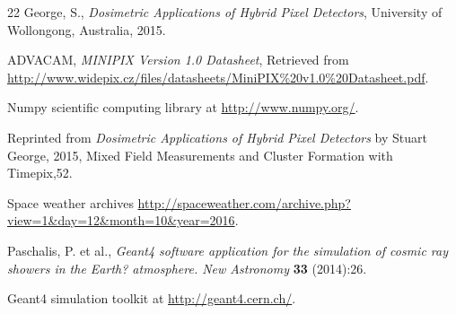 \begin{thebibliography}{9}
 22
  George, S., \textit{Dosimetric Applications of Hybrid Pixel Detectors}, University of Wollongong, Australia, 2015.

  ADVACAM, \textit{MINIPIX Version 1.0 Datasheet}, Retrieved from \url{http://www.widepix.cz/files/datasheets/MiniPIX\%20v1.0\%20Datasheet.pdf}.

  Numpy scientific computing library at \url{http://www.numpy.org/}.

  Reprinted from \textit{Dosimetric Applications of Hybrid Pixel Detectors} by Stuart George, 2015, Mixed Field Measurements and Cluster Formation with Timepix,52.

  Space weather archives \url{http://spaceweather.com/archive.php?view=1&day=12&month=10&year=2016}.

  Paschalis, P. et al., \textit{Geant4 software application for the simulation of cosmic ray showers in the Earth? atmosphere. New Astronomy} {\bf 33} (2014):26.

  Geant4 simulation toolkit at \url{http://geant4.cern.ch/}.

  

    



	
 
 




\end{thebibliography}
